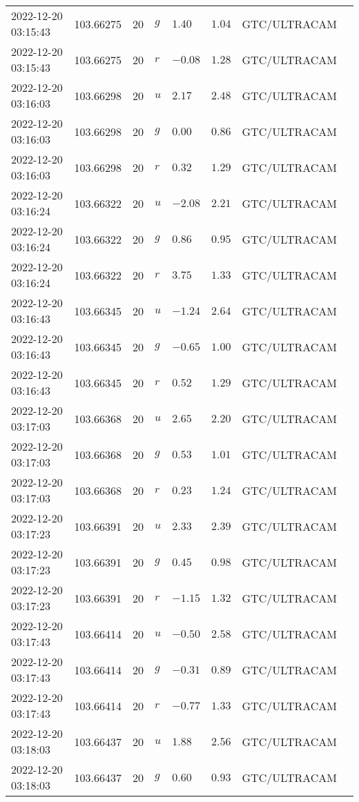 \documentclass{nature_plusfigure}
\begin{document}
\begin{supplement}
\begin{center}
\begin{longtable}{llllllll}
2022-12-20 03:15:43 & 103.66275 & 20 & $g$ & $1.40$ & $1.04$ & GTC/ULTRACAM &  \\ 
2022-12-20 03:15:43 & 103.66275 & 20 & $r$ & $-0.08$ & $1.28$ & GTC/ULTRACAM &  \\ 
2022-12-20 03:16:03 & 103.66298 & 20 & $u$ & $2.17$ & $2.48$ & GTC/ULTRACAM &  \\ 
2022-12-20 03:16:03 & 103.66298 & 20 & $g$ & $0.00$ & $0.86$ & GTC/ULTRACAM &  \\ 
2022-12-20 03:16:03 & 103.66298 & 20 & $r$ & $0.32$ & $1.29$ & GTC/ULTRACAM &  \\ 
2022-12-20 03:16:24 & 103.66322 & 20 & $u$ & $-2.08$ & $2.21$ & GTC/ULTRACAM &  \\ 
2022-12-20 03:16:24 & 103.66322 & 20 & $g$ & $0.86$ & $0.95$ & GTC/ULTRACAM &  \\ 
2022-12-20 03:16:24 & 103.66322 & 20 & $r$ & $3.75$ & $1.33$ & GTC/ULTRACAM &  \\ 
2022-12-20 03:16:43 & 103.66345 & 20 & $u$ & $-1.24$ & $2.64$ & GTC/ULTRACAM &  \\ 
2022-12-20 03:16:43 & 103.66345 & 20 & $g$ & $-0.65$ & $1.00$ & GTC/ULTRACAM &  \\ 
2022-12-20 03:16:43 & 103.66345 & 20 & $r$ & $0.52$ & $1.29$ & GTC/ULTRACAM &  \\ 
2022-12-20 03:17:03 & 103.66368 & 20 & $u$ & $2.65$ & $2.20$ & GTC/ULTRACAM &  \\ 
2022-12-20 03:17:03 & 103.66368 & 20 & $g$ & $0.53$ & $1.01$ & GTC/ULTRACAM &  \\ 
2022-12-20 03:17:03 & 103.66368 & 20 & $r$ & $0.23$ & $1.24$ & GTC/ULTRACAM &  \\ 
2022-12-20 03:17:23 & 103.66391 & 20 & $u$ & $2.33$ & $2.39$ & GTC/ULTRACAM &  \\ 
2022-12-20 03:17:23 & 103.66391 & 20 & $g$ & $0.45$ & $0.98$ & GTC/ULTRACAM &  \\ 
2022-12-20 03:17:23 & 103.66391 & 20 & $r$ & $-1.15$ & $1.32$ & GTC/ULTRACAM &  \\ 
2022-12-20 03:17:43 & 103.66414 & 20 & $u$ & $-0.50$ & $2.58$ & GTC/ULTRACAM &  \\ 
2022-12-20 03:17:43 & 103.66414 & 20 & $g$ & $-0.31$ & $0.89$ & GTC/ULTRACAM &  \\ 
2022-12-20 03:17:43 & 103.66414 & 20 & $r$ & $-0.77$ & $1.33$ & GTC/ULTRACAM &  \\ 
2022-12-20 03:18:03 & 103.66437 & 20 & $u$ & $1.88$ & $2.56$ & GTC/ULTRACAM &  \\ 
2022-12-20 03:18:03 & 103.66437 & 20 & $g$ & $0.60$ & $0.93$ & GTC/ULTRACAM &  \\ 

\end{longtable}
\end{center}
\end{supplement}
\end{document}
